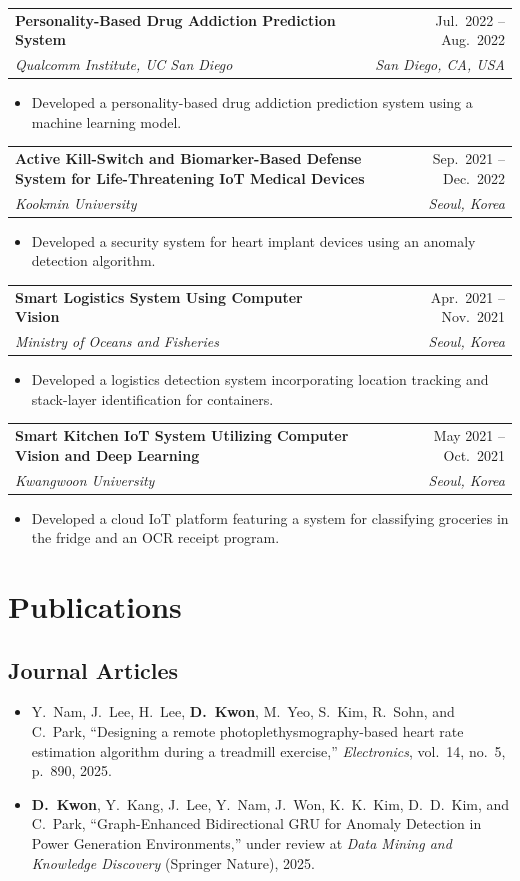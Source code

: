 \documentclass[11pt,letterpaper]{article}
\makeatletter
\newcommand{\entry}[4]{%
  \vspace{0.35em}\par
  \noindent\begin{tabularx}{\linewidth}{@{}X r@{}}
    \textbf{#1} & #2 \\[0.05em]
    \textit{#3} & \textit{#4}
  \end{tabularx}\par\vspace{0.1em}
}
\makeatother
\begin{document}
\entry{Personality-Based Drug Addiction Prediction System}{Jul.\ 2022 -- Aug.\ 2022}{Qualcomm Institute, UC San Diego}{San Diego, CA, USA}
\begin{itemize}
  \item Developed a personality-based drug addiction prediction system using a machine learning model.
\end{itemize}

\entry{Active Kill-Switch and Biomarker-Based Defense System for Life-Threatening IoT Medical Devices}{Sep.\ 2021 -- Dec.\ 2022}{Kookmin University}{Seoul, Korea}
\begin{itemize}
  \item Developed a security system for heart implant devices using an anomaly detection algorithm.
\end{itemize}

\entry{Smart Logistics System Using Computer Vision}{Apr.\ 2021 -- Nov.\ 2021}{Ministry of Oceans and Fisheries}{Seoul, Korea}
\begin{itemize}
  \item Developed a logistics detection system incorporating location tracking and stack-layer identification for containers.
\end{itemize}

\entry{Smart Kitchen IoT System Utilizing Computer Vision and Deep Learning}{May 2021 -- Oct.\ 2021}{Kwangwoon University}{Seoul, Korea}
\begin{itemize}
  \item Developed a cloud IoT platform featuring a system for classifying groceries in the fridge and an OCR receipt program.
\end{itemize}

\section{Publications}

\subsection{Journal Articles}
\begin{itemize}
  \item Y.~Nam, J.~Lee, H.~Lee, \textbf{D.~Kwon}, M.~Yeo, S.~Kim, R.~Sohn, and C.~Park, ``Designing a remote photoplethysmography-based heart rate estimation algorithm during a treadmill exercise,'' \emph{Electronics}, vol.~14, no.~5, p.~890, 2025.
  \item \textbf{D.~Kwon}, Y.~Kang, J.~Lee, Y.~Nam, J.~Won, K.~K.~Kim, D.~D.~Kim, and C.~Park, ``Graph-Enhanced Bidirectional GRU for Anomaly Detection in Power Generation Environments,'' under review at \emph{Data Mining and Knowledge Discovery} (Springer Nature), 2025.
\end{itemize}
\end{document}

